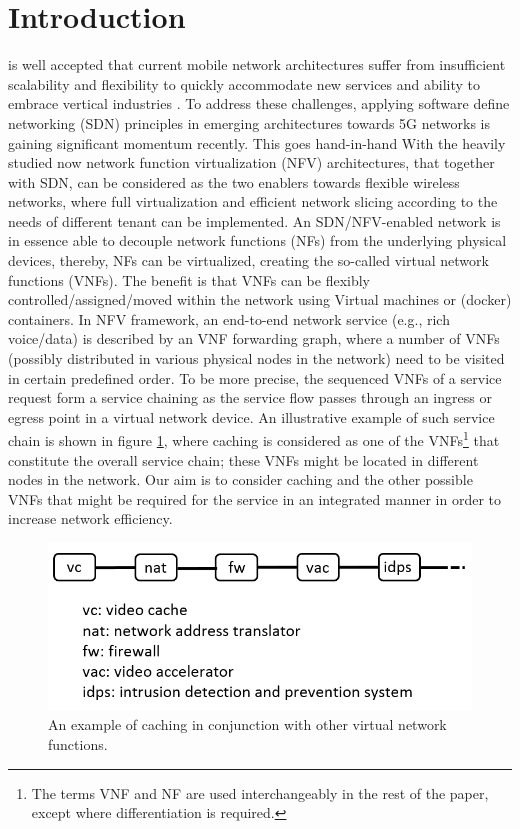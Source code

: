 \documentclass[journal]{IEEEtran}
\begin{document}
\section{Introduction}
 is well accepted that current mobile network architectures suffer from insufficient scalability and flexibility to quickly accommodate new services and ability to embrace vertical industries \cite{VNF state of art}. To address these challenges, applying software define networking (SDN)\cite{SDN} principles in emerging architectures towards 5G networks is gaining significant momentum recently\cite{Scalable and Flexible cellular core network Architecture}. This goes hand-in-hand With the heavily studied now network function virtualization (NFV) \cite{NFV} architectures, that together with SDN, can be considered as the two enablers towards flexible wireless networks, where full virtualization and efficient network slicing according to the needs of different tenant can be implemented. An SDN/NFV-enabled network is in essence able to decouple network functions (NFs) from the underlying physical devices, thereby, NFs can be virtualized, creating the so-called virtual network functions (VNFs). The benefit is that VNFs can be flexibly controlled/assigned/moved within the network using Virtual machines or (docker) containers. In NFV framework, an end-to-end network service (e.g., rich voice/data) is described by an VNF forwarding graph, where a number of VNFs (possibly distributed in various physical nodes in the network) need to be visited in certain predefined order\cite{VNF Chaining basic}. To be more precise, the sequenced VNFs of a service request form a service chaining as the service flow passes through an ingress or egress point in a virtual network device. An illustrative example of such service chain is shown in figure \ref{fig:example_chain}, where caching is considered as one of the  VNFs\footnote{The terms VNF and NF are used interchangeably in the rest of the paper, except where differentiation is required.} that constitute the overall service chain; these VNFs might be located in different nodes in the network. Our aim is to consider caching and the other possible VNFs that might be required for the service in an integrated manner in order to increase network efficiency.
\begin{figure}
  \includegraphics[width=0.9\columnwidth]{example_chain}
  \caption{An example of caching in conjunction with other virtual network functions.}
  \label{fig:example_chain}
\end{figure}
\end{document}
